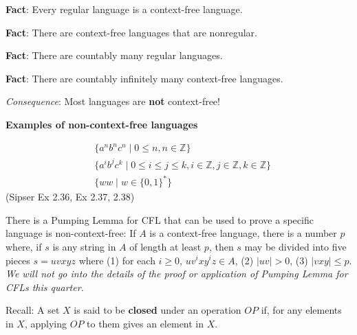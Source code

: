 \documentclass[12pt, oneside]{article}
\begin{document}
\vfill

{\bf Fact}: Every regular language is a context-free language.

\vfill

{\bf Fact}: There are context-free languages that are nonregular.

\vfill

{\bf Fact}: There are countably many regular languages.

\vfill

{\bf Fact}: There are countably infinitely many context-free languages.

\vfill

{\it Consequence}: Most languages are {\bf not} context-free!

\vfill

\newpage
{\bf Examples  of non-context-free languages}

\begin{align*}
    &\{ a^n b^n c^n \mid 0 \leq n , n \in \mathbb{Z}\}\\
    &\{ a^i b^j c^k \mid 0 \leq i \leq j \leq k , i \in \mathbb{Z}, j \in \mathbb{Z}, k \in \mathbb{Z}\}\\
    &\{ ww \mid w \in \{0,1\}^* \}
\end{align*}
(Sipser Ex 2.36, Ex 2.37, 2.38)

There is a Pumping Lemma for CFL that can be used to prove a specific language is non-context-free: 
If $A$ is a context-free language, there
is a number $p$ where, if $s$ is any string in $A$ of length at least $p$, then $s$ may be divided 
into five pieces $s = uvxyz$ where (1) for each $i \geq 0$, $uv^ixy^iz \in A$, (2) $|uv|>0$, (3) $|vxy| \leq p$.
{\it We will not go into the details of the proof or application of Pumping Lemma for CFLs this quarter.}


Recall: A set $X$ is said to be {\bf closed} under an operation $OP$ if, for any elements in $X$, applying 
$OP$ to them gives an element in $X$.  
\end{document}
